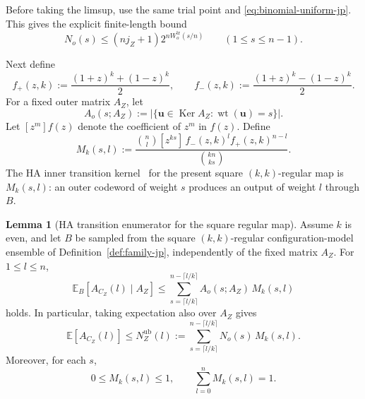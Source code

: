 \documentclass[11pt]{article}
\theoremstyle{definition}
\newtheorem{lemma}[theorem]{Lemma}
\newcommand{\EE}{\mathbb E}
\newcommand{\wt}{\operatorname{wt}}
\newcommand{\Ker}{\operatorname{Ker}}
\newcommand{\bu}{\mathbf u}
\newcommand{\CZ}{C_Z}
\begin{document}
Before taking the limsup, use the same trial point and
\eqref{eq:binomial-uniform-jp}. This gives the explicit finite-length bound
\[
N_o(s)\le (nj_Z+1)2^{nW_o^{\mathrm{tr}}(s/n)}
\qquad (1\le s\le n-1).
\]

Next define
\begin{equation*}
f_+(z,k):=\frac{(1+z)^k+(1-z)^k}{2},
\qquad
f_-(z,k):=\frac{(1+z)^k-(1-z)^k}{2}.
\end{equation*}
For a fixed outer matrix \(A_Z\), let
\begin{equation*}
A_o(s;A_Z):=\bigl|\{\bu\in\Ker A_Z:\wt(\bu)=s\}\bigr|.
\end{equation*}
Let \([z^m]f(z)\) denote the coefficient of \(z^m\) in \(f(z)\).
Define
\begin{equation*}
M_k(s,l)
:=
\frac{\binom{n}{l}[z^{ks}]\,f_-(z,k)^l f_+(z,k)^{n-l}}
{\binom{kn}{ks}}.
\end{equation*}
The HA inner transition kernel~\cite{HA05} for the present square \((k,k)\)-regular map is \(M_k(s,l)\): an outer codeword of weight \(s\) produces an output of weight \(l\) through \(B\).

\begin{lemma}[HA transition enumerator for the square regular map]\label{lem:HA-transition-jp}
Assume \(k\) is even, and let \(B\) be sampled from the square \((k,k)\)-regular
configuration-model ensemble of Definition~\ref{def:family-jp}, independently of the fixed matrix \(A_Z\). For \(1\le l\le n\),
\begin{equation*}
\EE_B[A_{\CZ}(l)\mid A_Z]
\le
\sum_{s=\lceil l/k\rceil}^{n-\lceil l/k\rceil} A_o(s;A_Z)\,M_k(s,l)
\end{equation*}
holds.
In particular, taking expectation also over \(A_Z\) gives
\begin{equation}\label{eq:HA-enum-jp}
\EE[A_{\CZ}(l)]
\le
N_Z^{\mathrm{ub}}(l)
:=
\sum_{s=\lceil l/k\rceil}^{n-\lceil l/k\rceil}
N_o(s)\,M_k(s,l).
\end{equation}
Moreover, for each \(s\),
\begin{equation*}
0\le M_k(s,l)\le 1,
\qquad
\sum_{l=0}^n M_k(s,l)=1.
\end{equation*}
\end{lemma}
\end{document}
